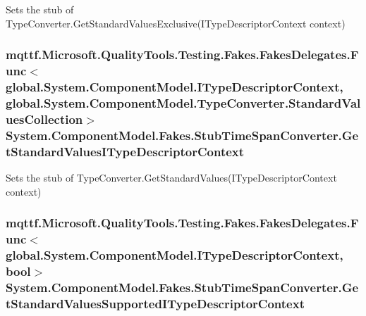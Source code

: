 Sets the stub of Type\-Converter.\-Get\-Standard\-Values\-Exclusive(\-I\-Type\-Descriptor\-Context context)

\hypertarget{class_system_1_1_component_model_1_1_fakes_1_1_stub_time_span_converter_a67b4a9cdf7b5da0af2d655c3edfb76cb}{
\subsubsection[{Get\-Standard\-Values\-I\-Type\-Descriptor\-Context}]{\setlength{\rightskip}{0pt plus 5cm}mqttf.\-Microsoft.\-Quality\-Tools.\-Testing.\-Fakes.\-Fakes\-Delegates.\-Func$<$global.\-System.\-Component\-Model.\-I\-Type\-Descriptor\-Context, global.\-System.\-Component\-Model.\-Type\-Converter.\-Standard\-Values\-Collection$>$ System.\-Component\-Model.\-Fakes.\-Stub\-Time\-Span\-Converter.\-Get\-Standard\-Values\-I\-Type\-Descriptor\-Context}}\label{class_system_1_1_component_model_1_1_fakes_1_1_stub_time_span_converter_a67b4a9cdf7b5da0af2d655c3edfb76cb}


Sets the stub of Type\-Converter.\-Get\-Standard\-Values(\-I\-Type\-Descriptor\-Context context)

\hypertarget{class_system_1_1_component_model_1_1_fakes_1_1_stub_time_span_converter_aade45882d0ca4542170679fce04f8428}{
\subsubsection[{Get\-Standard\-Values\-Supported\-I\-Type\-Descriptor\-Context}]{\setlength{\rightskip}{0pt plus 5cm}mqttf.\-Microsoft.\-Quality\-Tools.\-Testing.\-Fakes.\-Fakes\-Delegates.\-Func$<$global.\-System.\-Component\-Model.\-I\-Type\-Descriptor\-Context, bool$>$ System.\-Component\-Model.\-Fakes.\-Stub\-Time\-Span\-Converter.\-Get\-Standard\-Values\-Supported\-I\-Type\-Descriptor\-Context}}\label{class_system_1_1_component_model_1_1_fakes_1_1_stub_time_span_converter_aade45882d0ca4542170679fce04f8428}


